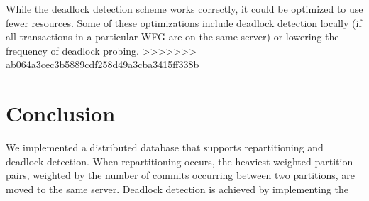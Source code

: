 \documentclass[a4paper, 10pt, notitlepage]{article}
\begin{document}
While the deadlock detection scheme works correctly, it could be optimized to use fewer resources. Some of these optimizations include deadlock detection locally (if all transactions in a particular WFG are on the same server) or lowering the frequency of deadlock probing.
>>>>>>> ab064a3cec3b5889cdf258d49a3cba3415ff338b



\section{Conclusion}
We implemented a distributed database that supports repartitioning and deadlock detection. When repartitioning occurs, the heaviest-weighted partition pairs, weighted by the number of commits occurring between two partitions, are moved to the same server. Deadlock detection is achieved by implementing the 

\end{document}
